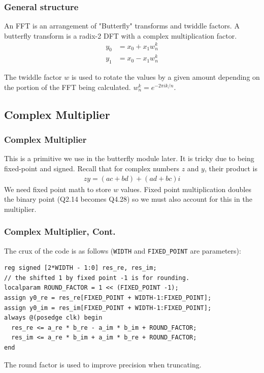 \documentclass{beamer}
\begin{document}
\begin{frame}
	\frametitle{General structure}
	An FFT is an arrangement of "Butterfly" transforms and twiddle factors.
	A butterfly transform is a radix-2 DFT with a complex multiplication factor.
	\begin{align*}
		y_0 &= x_0 + x_1 w_n^k \\
		y_1 &= x_0 - x_1 w_n^k
	\end{align*}
	\begin{figure}
		\centering
	\end{figure}
	The twiddle factor $w$ is used to rotate the values by a given amount depending on the
	portion of the FFT being calculated. $w_n^k = e^{-2\pi i k / n}$.
\end{frame}

\subsection{Complex Multiplier}
\begin{frame}
	\frametitle{Complex Multiplier}
	This is a primitive we use in the butterfly module later. It is tricky due
	to being fixed-point and signed. \pause Recall that for complex numbers $z$ and $y$,
	their product is
	\begin{align*}
		z y = (ac + bd) + (ad + bc)i
	\end{align*}
	\pause
	We need fixed point math to store $w$ values. Fixed point multiplication doubles
	the binary point (Q2.14 becomes Q4.28) so we must also account for this in the multiplier.

\end{frame}


\begin{frame}[fragile]
	\frametitle{Complex Multiplier, Cont.}
	The crux of the code is as follows (\texttt{WIDTH} and \texttt{FIXED\_POINT} are parameters):
\begin{verbatim}
reg signed [2*WIDTH - 1:0] res_re, res_im;
// the shifted 1 by fixed point -1 is for rounding.
localparam ROUND_FACTOR = 1 << (FIXED_POINT -1);
assign y0_re = res_re[FIXED_POINT + WIDTH-1:FIXED_POINT];
assign y0_im = res_im[FIXED_POINT + WIDTH-1:FIXED_POINT];
always @(posedge clk) begin
  res_re <= a_re * b_re - a_im * b_im + ROUND_FACTOR;
  res_im <= a_re * b_im + a_im * b_re + ROUND_FACTOR;
end
\end{verbatim}
The round factor is used to improve precision when truncating.
\end{frame}
\end{document}
